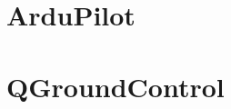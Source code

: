 \documentclass{article}
\begin{document}
\section{ArduPilot}


\section{QGroundControl}

\end{document}
